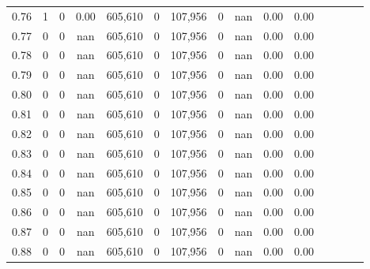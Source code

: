 \begin{tabular}{rrrcrrrrrrrrrrr}
0.76 &       1 &      0 &                                       0.00 &  605,610 &        0 &  107,956 &        0 &   nan &  0.00 &                         0.00 \\
0.77 &       0 &      0 &                                        nan &  605,610 &        0 &  107,956 &        0 &   nan &  0.00 &                         0.00 \\
0.78 &       0 &      0 &                                        nan &  605,610 &        0 &  107,956 &        0 &   nan &  0.00 &                         0.00 \\
0.79 &       0 &      0 &                                        nan &  605,610 &        0 &  107,956 &        0 &   nan &  0.00 &                         0.00 \\
0.80 &       0 &      0 &                                        nan &  605,610 &        0 &  107,956 &        0 &   nan &  0.00 &                         0.00 \\
0.81 &       0 &      0 &                                        nan &  605,610 &        0 &  107,956 &        0 &   nan &  0.00 &                         0.00 \\
0.82 &       0 &      0 &                                        nan &  605,610 &        0 &  107,956 &        0 &   nan &  0.00 &                         0.00 \\
0.83 &       0 &      0 &                                        nan &  605,610 &        0 &  107,956 &        0 &   nan &  0.00 &                         0.00 \\
0.84 &       0 &      0 &                                        nan &  605,610 &        0 &  107,956 &        0 &   nan &  0.00 &                         0.00 \\
0.85 &       0 &      0 &                                        nan &  605,610 &        0 &  107,956 &        0 &   nan &  0.00 &                         0.00 \\
0.86 &       0 &      0 &                                        nan &  605,610 &        0 &  107,956 &        0 &   nan &  0.00 &                         0.00 \\
0.87 &       0 &      0 &                                        nan &  605,610 &        0 &  107,956 &        0 &   nan &  0.00 &                         0.00 \\
0.88 &       0 &      0 &                                        nan &  605,610 &        0 &  107,956 &        0 &   nan &  0.00 &                         0.00 \\

\end{tabular}
